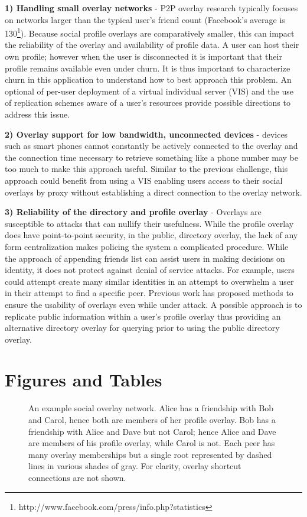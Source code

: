 {\bf 1) Handling small overlay networks} - P2P overlay research typically focuses on
networks larger than the typical user's friend count (Facebook's average is
130\footnote{http://www.facebook.com/press/info.php?statistics}).  Because social profile overlays are comparatively smaller, this can
impact the reliability of the overlay and availability of profile data.  A user
can host their own profile; however when the user is disconnected it is important
that their profile remains available even under churn. It is thus important to
characterize churn in this application to understand how to best approach this
problem. An optional of per-user deployment of a virtual individual server (VIS)
and the use of replication schemes aware of a user's resources provide possible
directions to address this issue.

{\bf 2) Overlay support for low bandwidth, unconnected devices} - devices such as
smart phones cannot constantly be actively connected to the overlay and the
connection time necessary to retrieve something like a phone number may be
too much to make this approach useful.  Similar to the previous challenge,
this approach could benefit from using a VIS enabling users access to their
social overlays by proxy without establishing a direct connection to the overlay
network.

{\bf 3) Reliability of the directory and profile overlay} - Overlays are
susceptible to attacks that can nullify their usefulness.  While
the profile overlay does have point-to-point security, in the public,
directory overlay, the lack of any form centralization makes policing the system
a complicated procedure.  While the approach of appending friends list can assist
users in making decisions on identity, it does not protect against denial of
service attacks.  For example, users could attempt create many similar identities
in an attempt to overwhelm a user in their attempt to find a specific peer.
Previous work has proposed methods to ensure the usability of overlays even
while under attack.  A possible approach is to replicate public information
within a user's profile overlay thus providing an alternative directory overlay
for querying prior to using the public directory overlay.

\section{Figures and Tables}

\begin{figure}[ht]
\centering
{}
\caption[An example social overlay network]{An example social overlay network.
Alice has a friendship with Bob and Carol, hence both are members of her
profile overlay. Bob has a friendship with Alice and Dave but not Carol; hence
Alice and Dave are members of his profile overlay, while Carol is not.  Each
peer has many overlay memberships but a single root represented by dashed lines
in various shades of gray.  For clarity, overlay shortcut connections are not
shown.}
\label{fig:system}
\end{figure}

